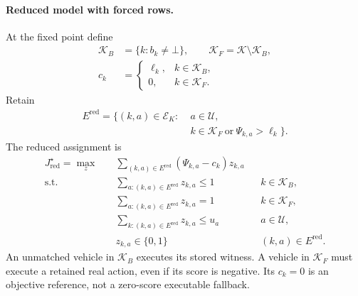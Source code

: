 \paragraph{Reduced model with forced rows.}
At the fixed point define
\begin{equation}
\begin{aligned}
\mathcal K_B&=\{k:b_k\ne\bot\},\qquad
\mathcal K_F=\mathcal K\setminus\mathcal K_B,\\
c_k&=\begin{cases}\ell_k,&k\in\mathcal K_B,\\0,&k\in\mathcal K_F.\end{cases}
\end{aligned}
\label{eq:baseline_forced_partition}
\end{equation}
Retain
\begin{equation}
\begin{split}
E^{\mathrm{red}}=\{(k,a)\in\mathcal E_K:\;&a\in\mathcal U,\\
&k\in\mathcal K_F\ \text{or}\ \Psi_{k,a}>\ell_k\}.
\end{split}
\label{eq:general_retained_edges}
\end{equation}
The reduced assignment is
\begin{align}
J_{\mathrm{red}}^\star=\max_z\quad&
\sum_{(k,a)\in E^{\mathrm{red}}}(\Psi_{k,a}-c_k)z_{k,a}
\label{eq:full_reduced_obj}\\
\text{s.t.}\quad&\sum_{a:(k,a)\in E^{\mathrm{red}}}z_{k,a}\le1
&&k\in\mathcal K_B,\label{eq:full_reduced_vehicle}\\
&\sum_{a:(k,a)\in E^{\mathrm{red}}}z_{k,a}=1
&&k\in\mathcal K_F,\label{eq:forced_reduced_vehicle}\\
&\sum_{k:(k,a)\in E^{\mathrm{red}}}z_{k,a}\le u_a
&&a\in\mathcal U,\label{eq:full_reduced_capacity}\\
&z_{k,a}\in\{0,1\}&&(k,a)\in E^{\mathrm{red}}.
\label{eq:full_reduced_binary}
\end{align}
An unmatched vehicle in $\mathcal K_B$ executes its stored witness.
A vehicle in $\mathcal K_F$ must execute a retained real action, even
if its score is negative. Its $c_k=0$ is an objective reference, not
a zero-score executable fallback.

